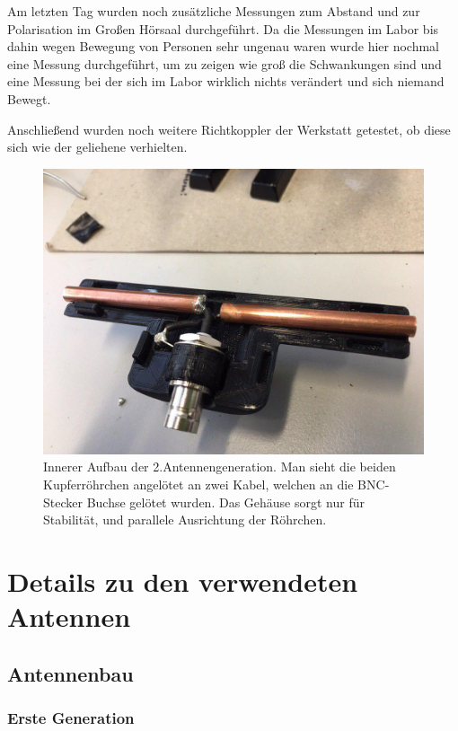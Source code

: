 \documentclass[titlepage,11pt,a4paper,ngerman]{article}
\begin{document}
Am letzten Tag wurden noch zusätzliche Messungen zum Abstand und zur Polarisation im Großen Hörsaal durchgeführt. Da die Messungen im Labor bis dahin wegen Bewegung von Personen sehr ungenau waren wurde hier nochmal eine Messung durchgeführt, um zu zeigen wie groß die Schwankungen sind und eine Messung bei der sich im Labor wirklich nichts verändert und sich niemand Bewegt.\par
Anschließend wurden noch weitere Richtkoppler der Werkstatt getestet, ob diese sich wie der geliehene verhielten.
\begin{figure}[ht]
	\centering
	\includegraphics[scale=0.4, trim={0cm 0cm 0cm 8cm}, clip]{Bilder/Ant_innen_2}
	\caption{Innerer Aufbau der 2.Antennengeneration. Man sieht die beiden Kupferröhrchen angelötet an zwei Kabel, welchen an die BNC-Stecker Buchse gelötet wurden. Das Gehäuse sorgt nur für Stabilität, und parallele Ausrichtung der Röhrchen.}
	\label{Antenne2}
\end{figure}

\section{Details zu den verwendeten Antennen}

\subsection{Antennenbau}

\subsubsection{Erste Generation}
\end{document}
